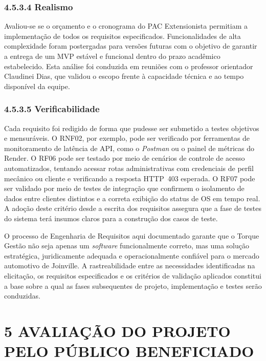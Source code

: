 \documentclass[12pt, a4paper]{article}
\begin{document}
\subsubsection{4.5.3.4 Realismo}

Avaliou-se se o orçamento e o cronograma do PAC Extensionista permitiam a
implementação de todos os requisitos especificados. Funcionalidades de alta
complexidade foram postergadas para versões futuras com o objetivo de garantir
a entrega de um MVP estável e funcional dentro do prazo acadêmico estabelecido.
Esta análise foi conduzida em reuniões com o professor orientador Claudinei
Dias, que validou o escopo frente à capacidade técnica e ao tempo disponível da
equipe.

\subsubsection{4.5.3.5 Verificabilidade}

Cada requisito foi redigido de forma que pudesse ser submetido a testes
objetivos e mensuráveis. O RNF02, por exemplo, pode ser verificado por
ferramentas de monitoramento de latência de API, como o \textit{Postman} ou o
painel de métricas do Render. O RF06 pode ser testado por meio de cenários de
controle de acesso automatizados, tentando acessar rotas administrativas com
credenciais de perfil mecânico ou cliente e verificando a resposta HTTP~403
esperada. O RF07 pode ser validado por meio de testes de integração que
confirmem o isolamento de dados entre clientes distintos e a correta exibição
do status de OS em tempo real. A adoção deste critério desde a escrita dos
requisitos assegura que a fase de testes do sistema terá insumos claros para a
construção dos casos de teste.

\bigskip
\noindent
O processo de Engenharia de Requisitos aqui documentado garante que o Torque
Gestão não seja apenas um \textit{software} funcionalmente correto, mas uma
solução estratégica, juridicamente adequada e operacionalmente confiável para
o mercado automotivo de Joinville. A rastreabilidade entre as necessidades
identificadas na elicitação, os requisitos especificados e os critérios de
validação aplicados constitui a base sobre a qual as fases subsequentes de
projeto, implementação e testes serão conduzidas.
 
\newpage
{}
\label{sec:avaliacao}
\section*{5 AVALIA\c{C}\~AO DO PROJETO PELO P\'UBLICO BENEFICIADO}
 
\end{document}
